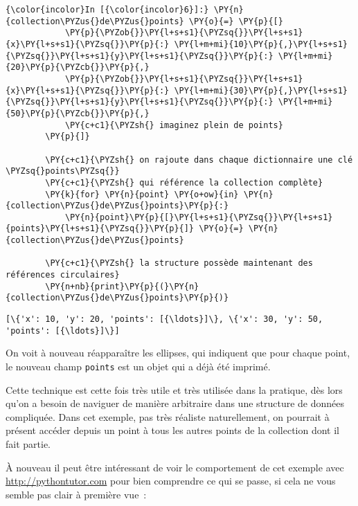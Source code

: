     \begin{Verbatim}[commandchars=\\\{\}]
{\color{incolor}In [{\color{incolor}6}]:} \PY{n}{collection\PYZus{}de\PYZus{}points} \PY{o}{=} \PY{p}{[}
            \PY{p}{\PYZob{}}\PY{l+s+s1}{\PYZsq{}}\PY{l+s+s1}{x}\PY{l+s+s1}{\PYZsq{}}\PY{p}{:} \PY{l+m+mi}{10}\PY{p}{,}\PY{l+s+s1}{\PYZsq{}}\PY{l+s+s1}{y}\PY{l+s+s1}{\PYZsq{}}\PY{p}{:} \PY{l+m+mi}{20}\PY{p}{\PYZcb{}}\PY{p}{,}
            \PY{p}{\PYZob{}}\PY{l+s+s1}{\PYZsq{}}\PY{l+s+s1}{x}\PY{l+s+s1}{\PYZsq{}}\PY{p}{:} \PY{l+m+mi}{30}\PY{p}{,}\PY{l+s+s1}{\PYZsq{}}\PY{l+s+s1}{y}\PY{l+s+s1}{\PYZsq{}}\PY{p}{:} \PY{l+m+mi}{50}\PY{p}{\PYZcb{}}\PY{p}{,}
            \PY{c+c1}{\PYZsh{} imaginez plein de points}
        \PY{p}{]}
        
        \PY{c+c1}{\PYZsh{} on rajoute dans chaque dictionnaire une clé \PYZsq{}points\PYZsq{}}
        \PY{c+c1}{\PYZsh{} qui référence la collection complète}
        \PY{k}{for} \PY{n}{point} \PY{o+ow}{in} \PY{n}{collection\PYZus{}de\PYZus{}points}\PY{p}{:}
            \PY{n}{point}\PY{p}{[}\PY{l+s+s1}{\PYZsq{}}\PY{l+s+s1}{points}\PY{l+s+s1}{\PYZsq{}}\PY{p}{]} \PY{o}{=} \PY{n}{collection\PYZus{}de\PYZus{}points}
        
        \PY{c+c1}{\PYZsh{} la structure possède maintenant des références circulaires}
        \PY{n+nb}{print}\PY{p}{(}\PY{n}{collection\PYZus{}de\PYZus{}points}\PY{p}{)}
\end{Verbatim}


    \begin{Verbatim}[commandchars=\\\{\}]
[\{'x': 10, 'y': 20, 'points': [{\ldots}]\}, \{'x': 30, 'y': 50, 'points': [{\ldots}]\}]

    \end{Verbatim}

    On voit à nouveau réapparaître les ellipses, qui indiquent que pour
chaque point, le nouveau champ \texttt{points} est un objet qui a déjà
été imprimé.

Cette technique est cette fois très utile et très utilisée dans la
pratique, dès lors qu'on a besoin de naviguer de manière arbitraire dans
une structure de données compliquée. Dans cet exemple, pas très réaliste
naturellement, on pourrait à présent accéder depuis un point à tous les
autres points de la collection dont il fait partie.

    À nouveau il peut être intéressant de voir le comportement de cet
exemple avec \url{http://pythontutor.com} pour bien comprendre ce qui se
passe, si cela ne vous semble pas clair à première vue~:


